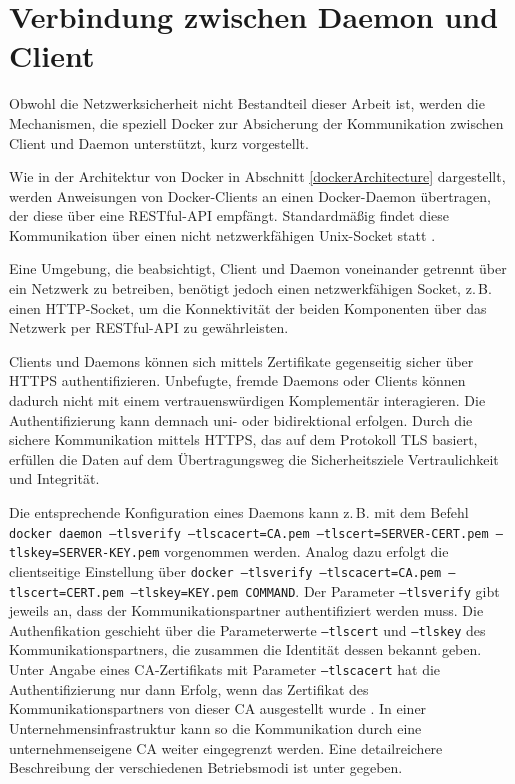 \documentclass[../main.tex]{subfiles}
\begin{document}


  \section{Verbindung zwischen Daemon und Client}
  \label{conClientServer}
    Obwohl die Netzwerksicherheit nicht Bestandteil dieser Arbeit ist, werden die Mechanismen, die speziell Docker zur Absicherung der Kommunikation zwischen Client und Daemon unterstützt, kurz vorgestellt.

    Wie in der Architektur von Docker in Abschnitt \ref{dockerArchitecture} dargestellt, werden Anweisungen von Docker-Clients an einen Docker-Daemon übertragen, der diese über eine \acrshort{REST}ful-\acrshort{API} empfängt. Standardmäßig findet diese Kommunikation über einen nicht netzwerkfähigen Unix-Socket statt \cite{dockerSecurity}.

    Eine Umgebung, die beabsichtigt, Client und Daemon voneinander getrennt über ein Netzwerk zu betreiben, benötigt jedoch einen netzwerkfähigen Socket, z.\,B. einen \acrshort{HTTP}-Socket, um die Konnektivität der beiden Komponenten über das Netzwerk per RESTful-API zu gewährleisten.

    Clients und Daemons können sich mittels Zertifikate gegenseitig sicher über HTTPS authentifizieren. Unbefugte, fremde Daemons oder Clients können dadurch nicht mit einem vertrauenswürdigen Komplementär interagieren. Die Authentifizierung kann demnach uni- oder bidirektional erfolgen. Durch die sichere Kommunikation mittels HTTPS, das auf dem Protokoll \acrshort{TLS} basiert, erfüllen die Daten auf dem Übertragungsweg die Sicherheitsziele Vertraulichkeit und Integrität.

    Die entsprechende Konfiguration eines Daemons kann z.\,B. mit dem Befehl \texttt{docker daemon --tlsverify --tlscacert=CA.pem --tlscert=SERVER-CERT.pem --tlskey=SERVER-KEY.pem} vorgenommen werden. Analog dazu erfolgt die clientseitige Einstellung über \texttt{docker --tlsverify --tlscacert=CA.pem --tlscert=CERT.pem --tlskey=KEY.pem COMMAND}. Der Parameter \texttt{--tlsverify} gibt jeweils an, dass der Kommunikationspartner authentifiziert werden muss. Die Authenfikation geschieht über die Parameterwerte \texttt{--tlscert} und \texttt{--tlskey} des Kommunikationspartners, die zusammen die Identität dessen bekannt geben. Unter Angabe eines \acrshort{CA}-Zertifikats mit Parameter \texttt{--tlscacert} hat die Authentifizierung nur dann Erfolg, wenn das Zertifikat des Kommunikationspartners von dieser \acrshort{CA} ausgestellt wurde \cite{dockerSecurityHTTPS}. In einer Unternehmensinfrastruktur kann so die Kommunikation durch eine unternehmenseigene CA weiter eingegrenzt werden. Eine detailreichere Beschreibung der verschiedenen Betriebsmodi ist unter \cite{dockerSecurityHTTPS} gegeben.
\end{document}
